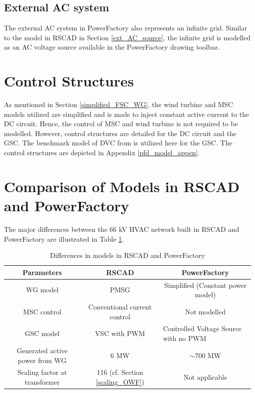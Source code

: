\subsection{External AC system}
The external \gls{AC} system in PowerFactory also represents an infinite grid. Similar to the model in RSCAD in Section \ref{ext_AC_source}, the infinite grid is modelled as an \gls{AC} voltage source available in the PowerFactory drawing toolbar. 

\section{Control Structures}
As mentioned in Section \ref{simplified_FSC_WG}, the wind turbine and \gls{MSC} models utilized are simplified and is made to inject constant active current to the \gls{DC} circuit. Hence, the control of \gls{MSC} and wind turbine is not required to be modelled. However, control structures are detailed for the \gls{DC} circuit and the \gls{GSC}. The benchmark model of \gls{DVC} from \cite{erlich_description_2018} is utilized here for the \gls{GSC}. The control structures are depicted in Appendix \ref{pfd_model_appen}.      

\section{Comparison of Models in RSCAD and PowerFactory }
The major differences between the 66 kV \gls{HVAC} network built in RSCAD and PowerFactory are illustrated in Table \ref{tab:Comp_RSCAD_PFD_Para}. 
\vspace{-1mm}
\begingroup
\renewcommand{\arraystretch}{1.2} %
\begin{table}[H]
\centering
\begin{tabular}{|c|c|c|}
\hline
\textbf{Parameters}   & \textbf{RSCAD}         & \textbf{PowerFactory}             \\ \hline
WG model      & PMSG   & Simplified (Constant power model)                                \\ \hline
MSC control   & Conventional current control     & Not modelled           \\ \hline
GSC model & {VSC with PWM} & \multicolumn{1}{l|}{Controlled Voltage Source with no PWM}  \\ \hline
Generated active power from WG  & 6 MW  & $\sim{700}$ MW                                    \\ \hline
Scaling factor at transformer & 116 (cf. Section \ref{scaling_OWF}) & Not applicable                           \\ \hline
\end{tabular}
\caption{Differences in models in RSCAD and PowerFactory}
\label{tab:Comp_RSCAD_PFD_Para}
\end{table}
\endgroup

